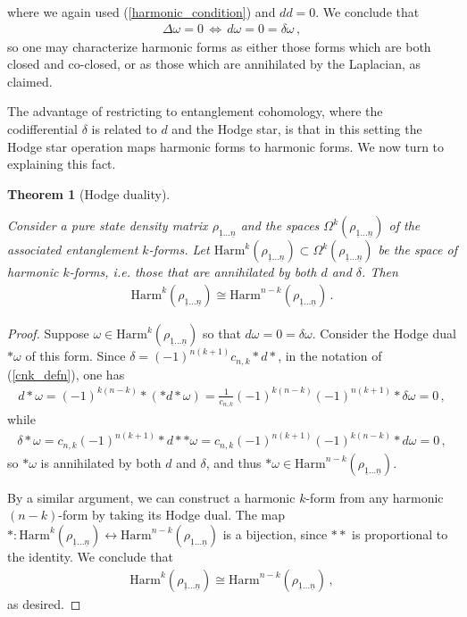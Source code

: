 \documentclass[12pt]{article}
\newtheorem{thm}{Theorem}[section]
\newcommand{\ul}[1]{{\underline{#1}}}
\numberwithin{equation}{section}
\newcommand{\rhooneton}{{\rho_{\ul{1} \ldots \ul{n}}}}
\begin{document}
%
where we again used (\ref{harmonic_condition}) and $dd = 0$. We conclude that
%
\begin{align}
    \Delta \omega = 0 \, \iff \, d \omega = 0 = \delta \omega \, ,
\end{align}
%
so one may characterize harmonic forms as either those forms which are both closed and co-closed, or as those which are annihilated by the Laplacian, as claimed.


The advantage of restricting to entanglement cohomology, where the codifferential $\delta$ is related to $d$ and the Hodge star, is that in this setting the Hodge star operation maps harmonic forms to harmonic forms. We now turn to explaining this fact.



\begin{thm}[Hodge duality]\label{hodge_duality}

Consider a pure state density matrix $\rhooneton$ and the spaces $\Omega^k ( \rhooneton )$ of the associated entanglement $k$-forms. Let $\mathrm{Harm}^k ( \rhooneton ) \subset \Omega^k ( \rhooneton )$ be the space of harmonic $k$-forms, i.e. those that are annihilated by both $d$ and $\delta$. Then
%
\begin{align}
    \mathrm{Harm}^k ( \rhooneton ) \cong \mathrm{Harm}^{n-k} ( \rhooneton ) \, .
\end{align}
%
\end{thm}

\begin{proof}

Suppose $\omega \in \mathrm{Harm}^k ( \rhooneton )$ so that $d \omega = 0 = \delta \omega$. Consider the Hodge dual $\ast \omega$ of this form. Since $\delta = ( - 1 )^{n ( k + 1 ) } c_{n, k} \ast d \ast$, in the notation of (\ref{cnk_defn}), one has
%
\begin{align}
    d \ast \omega = ( - 1)^{k ( n - k ) } \ast \left( \ast d \ast \omega \right) = \frac{1}{c_{n, k}} ( - 1)^{k ( n - k ) } ( - 1 )^{n ( k + 1 ) } \ast \delta \omega = 0 \, ,
\end{align}
%
while
%
\begin{align}
    \delta \ast \omega = c_{n, k} ( - 1 )^{n ( k + 1 ) } \ast d \ast \ast \omega = c_{n, k} ( - 1 )^{n ( k + 1 ) } ( - 1 )^{k ( n - k) } \ast d \omega = 0 \, ,
\end{align}
%
so $\ast \omega$ is annihilated by both $d$ and $\delta$, and thus $\ast \omega \in \mathrm{Harm}^{n-k} ( \rhooneton )$. 

By a similar argument, we can construct a harmonic $k$-form from any harmonic $(n-k)$-form by taking its Hodge dual. The map $\ast : \mathrm{Harm}^k ( \rhooneton ) \leftrightarrow \mathrm{Harm}^{n-k} ( \rhooneton )$ is a bijection, since $\ast \ast$ is proportional to the identity. We conclude that
%
\begin{align}
    \mathrm{Harm}^k ( \rhooneton ) \cong \mathrm{Harm}^{n-k} ( \rhooneton ) \, ,
\end{align}
%
as desired.
\end{proof}
\end{document}
